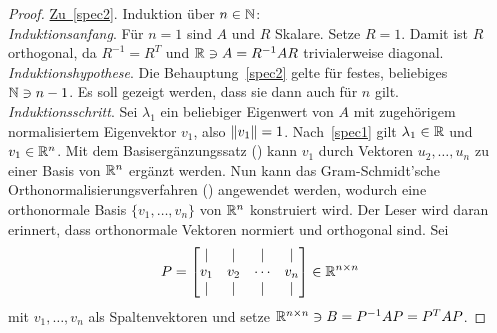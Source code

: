 \begin{proof}
    \underline{Zu~\ref{spec2}}. Induktion über \(n \in \mathbb{N}\): \\
    \textit{Induktionsanfang}. 
    Für \(n=1\) sind \(A\) und \(R\) Skalare. 
    Setze \(R=1\). 
    Damit ist \(R\) orthogonal, da \(R^{-1}=R^{T}\) und \(\mathbb{R} \ni A = R^{-1}AR\) trivialerweise diagonal. \\
    \textit{Induktionshypothese}. 
    Die Behauptung~\ref{spec2} gelte für festes, beliebiges \(\mathbb{N} \ni n-1\). 
    Es soll gezeigt werden, dass sie dann auch für \(n\) gilt.  \\
    \textit{Induktionsschritt}.  
    Sei \(\lambda_1\) ein beliebiger Eigenwert von \(A\) mit zugehörigem normalisiertem Eigenvektor \(v_1\), also \(\lVert v_1\rVert = 1\).  
    Nach~\ref{spec1} gilt \(\lambda_1 \in \mathbb{R}\) und \(v_1 \in \mathbb{R}^{n}\). 
    Mit dem Basisergänzungssatz () kann \(v_1\) durch Vektoren \(u_2,\ldots,u_n\) zu einer Basis von \(\mathbb{R}^{n}\) ergänzt werden. 
    Nun kann das Gram-Schmidt’sche Orthonormalisierungsverfahren () angewendet werden, wodurch eine orthonormale Basis \(\{v_1,\ldots,v_n\}\) von \(\mathbb{R}^{n}\) konstruiert wird.  
    Der Leser wird daran erinnert, dass orthonormale Vektoren normiert und orthogonal sind.
    Sei 
    \begin{equation*}
        P = 
        \begin{bmatrix}
            \vert & \vert & \vert & \vert\\
            v_1 & v_2 & \cdots & v_n \\
            \vert & \vert & \vert & \vert
        \end{bmatrix} 
        \in \mathbb{R} ^{n \times n}
    \end{equation*} 
    mit \(v_1,\ldots,v_n\) als Spaltenvektoren und setze \(\mathbb{R}^{n \times n} \ni B = P^{-1}AP = P^{T}AP\).


\end{proof}
